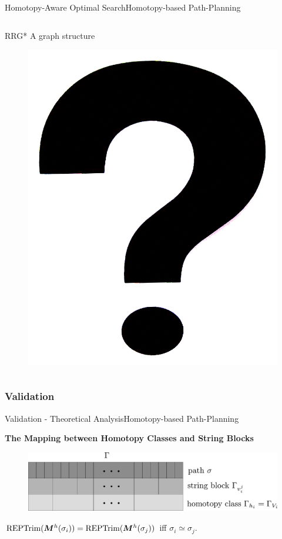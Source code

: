 \begin{frame}{Homotopy-Aware Optimal Search}{Homotopy-based Path-Planning}
\begin{columns}
\begin{block}{RRG*}
A graph structure
\begin{figure}
	\centering
	\includegraphics[width=.5\linewidth]{figure/question_mark}
\end{figure}
\end{block}
\end{columns}

\end{frame}

\subsubsection{Validation}

\begin{frame}{Validation - Theoretical Analysis}{Homotopy-based Path-Planning}
	
{\bf The Mapping between Homotopy Classes and String Blocks}

\begin{figure}
	\centering
	\includegraphics[width=.7\linewidth]{figure/decomp_hierarchy}
\end{figure}

\begin{thm}
${\rm REPTrim}(\bm{M}^h(\sigma_i)) =  {\rm REPTrim}(\bm{M}^h(\sigma_j )) $\footnotemark
 iff $\sigma_i \simeq \sigma_j$.
\end{thm}	
	
	
\end{frame}

